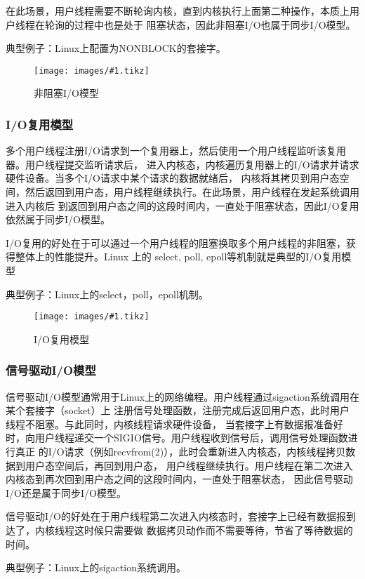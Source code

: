 \documentclass[supercite]{HustGraduPaper}
\newcommand{\cfig}[3]{
  \begin{figure}[htb]
    \centering
    \texttt{[image: images/\#1.tikz]}
    \caption{#3}
    \label{fig:#1}
  \end{figure}
}
\theoremstyle{definition}
\begin{document}
在此场景，用户线程需要不断轮询内核，直到内核执行上面第二种操作，本质上用户线程在轮询的过程中也是处于
阻塞状态，因此非阻塞I/O也属于同步I/O模型。\par

典型例子：Linux上配置为NONBLOCK的套接字。\par

\cfig{nonblock-io}{0.5}{非阻塞I/O模型}

\subsubsection{I/O复用模型}
多个用户线程注册I/O请求到一个复用器上，然后使用一个用户线程监听该复用器。用户线程提交监听请求后，
进入内核态，内核遍历复用器上的I/O请求并请求硬件设备。当多个I/O请求中某个请求的数据就绪后，
内核将其拷贝到用户态空间，然后返回到用户态，用户线程继续执行。在此场景，用户线程在发起系统调用进入内核后
到返回到用户态之间的这段时间内，一直处于阻塞状态，因此I/O复用依然属于同步I/O模型。\par

I/O复用的好处在于可以通过一个用户线程的阻塞换取多个用户线程的非阻塞，获得整体上的性能提升。Linux 上的
select, poll, epoll等机制就是典型的I/O复用模型\par

典型例子：Linux上的select，poll，epoll机制。\par

\cfig{io-multiplex}{0.7}{I/O复用模型}

\subsubsection{信号驱动I/O模型}
信号驱动I/O模型通常用于Linux上的网络编程。用户线程通过sigaction系统调用在某个套接字（socket）上
注册信号处理函数，注册完成后返回用户态，此时用户线程不阻塞。与此同时，内核线程请求硬件设备，
当套接字上有数据报准备好时，向用户线程递交一个SIGIO信号。用户线程收到信号后，调用信号处理函数进行真正
的I/O请求（例如recvfrom(2)），此时会重新进入内核态，内核线程拷贝数据到用户态空间后，再回到用户态，
用户线程继续执行。用户线程在第二次进入内核态到再次回到用户态之间的这段时间内，一直处于阻塞状态，
因此信号驱动I/O还是属于同步I/O模型。\par

信号驱动I/O的好处在于用户线程第二次进入内核态时，套接字上已经有数据报到达了，内核线程这时候只需要做
数据拷贝动作而不需要等待，节省了等待数据的时间。\par

典型例子：Linux上的sigaction系统调用。\par
\end{document}
